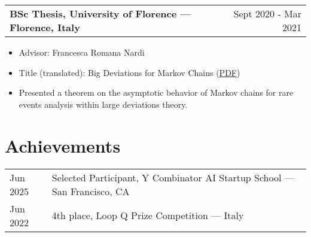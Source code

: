 \documentclass[a4paper,12pt]{article}
\makeatletter
\newenvironment{joblong}[2]
    {
    \begin{tabularx}{\linewidth}{@{}l X r@{}}
    \textbf{#1} & \hfill &  #2 \\[3.75pt]
    \end{tabularx}
    \begin{minipage}[t]{\linewidth}
    \begin{itemize}[nosep,after=\strut, leftmargin=1em, itemsep=3pt,label=--]
    }
    {
    \end{itemize}
    \end{minipage}    
    }
\makeatother
\begin{document}
\begin{joblong}{BSc Thesis, University of Florence — Florence, Italy}{Sept 2020 - Mar 2021}
\item Advisor: Francesca Romana Nardi
\item Title (translated): Big Deviations for Markov Chains (\href{https://github.com/Freddavide/Freddavide/blob/main/elaborato_B036_Baldelli_Davide.pdf}{PDF})
\item Presented a theorem on the asymptotic behavior of Markov chains for rare events analysis within large deviations theory.
\end{joblong}
  



\section{Achievements}
\begin{tabularx}{\linewidth}{@{}l X@{}}
Jun 2025 & Selected Participant, Y Combinator AI Startup School — San Francisco, CA \\
Jun 2022 & 4th place, Loop Q Prize Competition — Italy \\
\end{tabularx}
\end{document}
